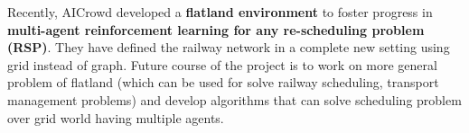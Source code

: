\vspace{\baselineskip}
Recently, AICrowd developed a \textbf{flatland environment}\cite{ARTICLE:3} to foster progress in \textbf{multi-agent
reinforcement learning for any re-scheduling problem (RSP)}. They have defined
the railway network in a complete new setting using grid instead of graph. Future course of the project is to 
work on more general problem of flatland (which can be used for solve railway scheduling, 
transport management problems) and develop algorithms that can solve scheduling problem over 
grid world having multiple agents. 

